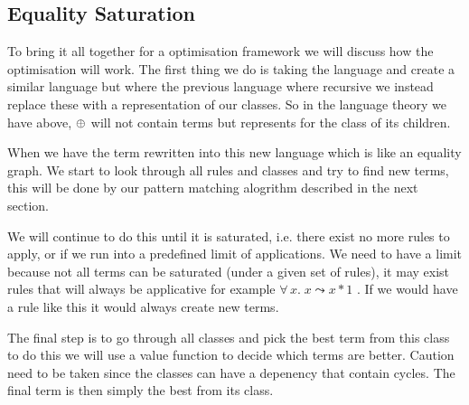 \subsection{Equality Saturation}
To bring it all together for a optimisation framework we will discuss how the optimisation
will work. The first thing we do is taking the language and create a similar language
but where the previous language where recursive we instead replace these with a
representation of our classes. So in the language theory we have above, $\oplus$ will
not contain terms but represents for the class of its children.

When we have the term rewritten into this new language which is like an equality
graph. We start to look through all rules and classes and try to find new terms,
this will be done by our pattern matching alogrithm described in the next section.

We will continue to do this until it is saturated, i.e. there exist no more rules
to apply, or if we run into a predefined limit of applications. We need to have a
limit because not all terms can be saturated (under a given set of rules), it may
exist rules that will always be applicative for example $\forall \,x. \; x \leadsto x * 1$
. If we would have a rule like this it would always create new terms.

The final step is to go through all classes and pick the best term from this class
to do this we will use a value function to decide which terms are better. Caution
need to be taken since the classes can have a depenency that contain cycles. The
final term is then simply the best from its class.




